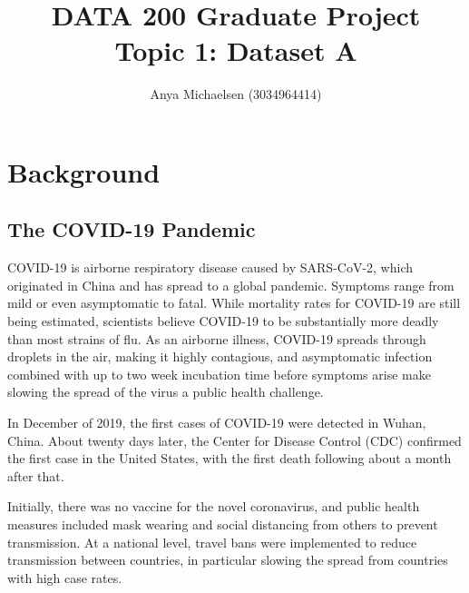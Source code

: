 \documentclass[11pt]{article}
\title{DATA 200 Graduate Project\\ Topic 1: Dataset A}
\author{ Anya Michaelsen (3034964414) }
\date{}
\begin{document}
\maketitle	

 \tableofcontents


%
%
%
%
%

\pagebreak
\section{Background}


\subsection{The COVID-19 Pandemic}

COVID-19 is airborne respiratory disease caused by SARS-CoV-2, which originated in China and has spread to a global pandemic. Symptoms range from mild or even asymptomatic to fatal. While mortality rates for COVID-19 are still being estimated, scientists believe COVID-19 to be substantially more deadly than most strains of flu.%
 As an airborne illness, COVID-19 spreads through droplets in the air, making it highly contagious, and asymptomatic infection combined with up to two week incubation time before symptoms arise make slowing the spread of the virus a public health challenge. 
 
 In December of 2019, the first cases of COVID-19 were detected in Wuhan, China. About twenty days later, the Center for Disease Control (CDC) confirmed the first case in the United States, with the first death following about a month after that. 
 
 Initially, there was no vaccine for the novel coronavirus, and public health measures included mask wearing and social distancing from others to prevent transmission. At a national level, travel bans were implemented to reduce transmission between countries, in particular slowing the spread from countries with high case rates. 
 
\end{document}
